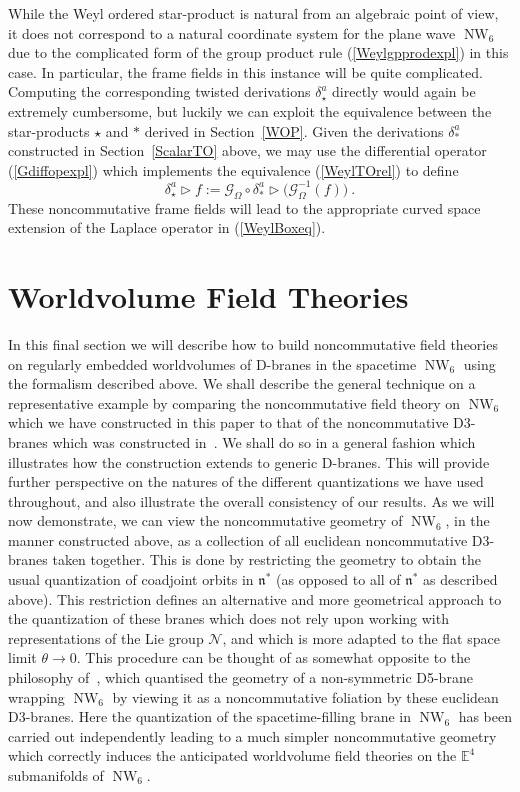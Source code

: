 \documentclass[11pt,a4paper]{article}
\DeclareMathOperator{\NW}{NW}
\newcommand{\1}{\mathbb{1}}
\def\mfn{{\mathfrak n}}
\newcommand{\eucl}{{\mathbb E}}
\begin{document}
While the Weyl ordered star-product is natural from an algebraic point
of view, it does not correspond to a natural coordinate system for the
plane wave $\NW_6$ due to the complicated form of the group product
rule (\ref{Weylgpprodexpl}) in this case. In particular, the frame
fields in this instance will be quite complicated. Computing the
corresponding twisted derivations $\delta^a_\star$ directly would
again be extremely cumbersome, but luckily we can exploit the
equivalence between the star-products $\star$ and $*$ derived in
Section~\ref{WOP}. Given the derivations $\delta^a_*$ constructed in
Section~\ref{ScalarTO} above, we may use the differential operator
(\ref{Gdiffopexpl}) which implements the equivalence (\ref{WeylTOrel})
to define
\begin{equation}
\delta^a_\star\triangleright f:=\mathcal{G}^{~}_\Omega\circ
\delta^a_*\triangleright\bigl(\mathcal{G}_\Omega^{-1}(f)\bigr) \ .
\label{Weyldelta}\end{equation}
These noncommutative frame fields will lead to the appropriate curved
space extension of the Laplace operator in (\ref{WeylBoxeq}).

\section{Worldvolume Field Theories\label{D3Branes}}

In this final section we will describe how to build noncommutative
field theories on regularly embedded worldvolumes of D-branes in the
spacetime $\NW_6$ using the formalism described above. We shall
describe the general technique on a representative example by
comparing the noncommutative field theory on $\NW_6$ which we have
constructed in this paper to that of the noncommutative D3-branes
which was constructed in~\cite{HSz1}. We shall do so in a general
fashion which illustrates how the construction extends to generic
D-branes. This will provide further perspective on the natures of the different
quantizations we have used throughout, and also illustrate the overall
consistency of our results. As we will now demonstrate, we can view
the noncommutative geometry of $\NW_6$, in the manner constructed
above, as a collection of all euclidean noncommutative D3-branes taken
together. This is done by restricting the geometry to obtain the usual
quantization of coadjoint orbits in $\mfn^*$ (as opposed to all of
$\mfn^*$ as described above). This restriction defines an alternative
and more geometrical approach to the quantization of these branes which
does not rely upon working with representations of the Lie group
$\mathcal{N}$, and which is more adapted to the flat space limit
$\theta\to0$. This procedure can be thought of as somewhat opposite to
the philosophy of~\cite{HSz1}, which quantised the geometry of a
non-symmetric D5-brane wrapping $\NW_6$ by viewing it as a
noncommutative foliation by these euclidean D3-branes. Here the
quantization of the spacetime-filling brane in $\NW_6$ has been
carried out independently leading to a much simpler noncommutative
geometry which correctly induces the anticipated worldvolume field
theories on the $\eucl^4$ submanifolds of $\NW_6$.
\end{document}
